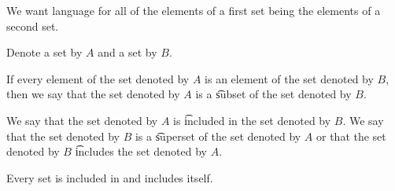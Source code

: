

We want language for all of the elements of a first set being the elements of a second set.


Denote a set by $A$ and a set by $B$.

\begin{definition}[Subsets]
If every element of the set denoted by $A$ is an element of the set denoted by $B$, then we say that the set denoted by $A$ is a \t{subset} of the set denoted by $B$.
\label{set_inclusion:subsets}
\end{definition}

We say that the set denoted by $A$ is \t{included} in the set denoted by $B$.
We say that the set denoted by $B$ is a \t{superset} of the set denoted by $A$ or that the set denoted by $B$ \t{includes} the set denoted by $A$.

Every set is included in and includes itself.



